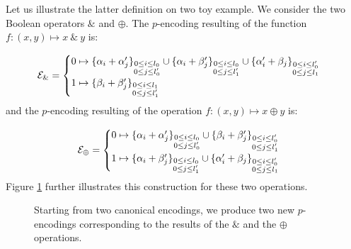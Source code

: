Let us illustrate the latter definition on two toy example. We consider the two Boolean operators $\&$ and $\oplus$. The $p$-encoding resulting of the function $f: (x, y) \mapsto x ~\&~ y$ is: 

\begin{equation}
\mathcal{E}_\& = \begin{cases}
0 \mapsto \{\alpha_i + \alpha'_j\}_{\substack{0\le i \le l_0 \\ 0 \le j \le l_0'}} \cup \{\alpha_i + \beta'_j\}_{\substack{0 \le i \le l_0 \\ 0 \le j \le l'_1}} \cup \{\alpha'_i + \beta_j\}_{\substack{0 \le i \le l'_0 \\ 0 \le j \le l_1}}\\
1 \mapsto \{\beta_i + \beta'_j\}_{\substack{0\le i \le l_1 \\ 0 \le j \le l_1'}}
\end{cases}
\label{eq:encoding_and}
\end{equation}
and the $p$-encoding resulting of the operation $f: (x, y) \mapsto x \oplus y$ is:

\begin{equation}
\mathcal{E}_\oplus = \begin{cases}
0 \mapsto \{\alpha_i + \alpha'_j\}_{\substack{0\le i \le l_0 \\ 0 \le j \le l_0'}} \cup \{\beta_i + \beta'_j\}_{\substack{0 \le i \le l'_0 \\ 0 \le j \le l'_1}}\\
1 \mapsto \{\alpha_i + \beta'_j\}_{\substack{0\le i \le l_0 \\ 0 \le j \le l_1'}} \cup \{\alpha'_i + \beta_j\}_{\substack{0\le i \le l_0' \\ 0 \le j \le l_1}} \\
\end{cases}
\label{eq:encoding_xor}
\end{equation}
%
Figure \ref{fig:operations} further illustrates this construction for these two operations.

\begin{figure}
	\centering
	\caption{Starting from two canonical encodings, we produce two new $p$-encodings corresponding to the results of the $\&$ and the $\oplus$ operations.}
	\label{fig:operations}
\end{figure}


